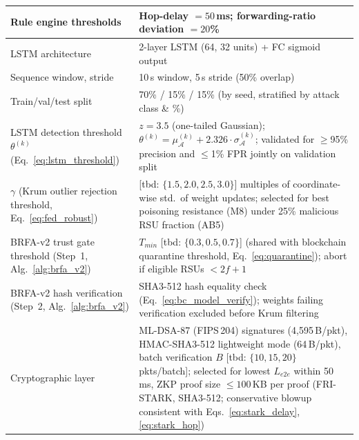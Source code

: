 \documentclass[12pt, a4paper]{report}
\begin{document}
{{\begin{longtable}{|m{5.0cm}|m{9.0cm}|}
            \hline
            Rule engine thresholds & Hop-delay $= 50$\,ms; forwarding-ratio deviation $= 20$\% \\
            \hline
            LSTM architecture & 2-layer LSTM (64, 32 units) + FC sigmoid output \\
            \hline
            Sequence window, stride & 10\,s window, 5\,s stride (50\% overlap) \\
            \hline
            Train/val/test split & 70\% / 15\% / 15\% (by seed, stratified by attack class \& \%) \\
            \hline
            LSTM detection threshold $\theta^{(k)}$ (Eq.~\ref{eq:lstm_threshold}) &
            $z = 3.5$ (one-tailed Gaussian); $\theta^{(k)} = \mu_{\mathcal{A}}^{(k)} + 2.326 \cdot \sigma_{\mathcal{A}}^{(k)}$;
            validated for $\geq$95\% precision and $\leq$1\% FPR jointly on validation split \\           
            \hline
              $\gamma$ (Krum outlier rejection threshold, Eq.~\ref{eq:fed_robust}) & [tbd: $\{1.5, 2.0, 2.5, 3.0\}$] multiples of coordinate-wise std.\ of weight updates;   selected for best poisoning resistance (M8) under 25\% malicious RSU fraction (AB5) \\
            \hline
              BRFA-v2 trust gate threshold (Step~1, Alg.~\ref{alg:brfa_v2}) &              $T_{min}$ [tbd: $\{0.3, 0.5, 0.7\}$] (shared with blockchain quarantine threshold, Eq.~\ref{eq:quarantine}); abort if eligible RSUs $< 2f{+}1$ \\
             \hline
              BRFA-v2 hash verification (Step~2, Alg.~\ref{alg:brfa_v2}) &              SHA3-512 hash equality check (Eq.~\ref{eq:bc_model_verify}); weights failing
              verification excluded before Krum filtering \\
              \hline
            Cryptographic layer & ML-DSA-87 (FIPS\,204) signatures (4,595\,B/pkt),
            HMAC-SHA3-512 lightweight mode (64\,B/pkt),
            batch verification $B$ [tbd: $\{10, 15, 20\}$\,pkts/batch];
            selected for lowest $L_{e2e}$ within 50\,ms,  ZKP proof size  $\leq 100$\,KB per proof   (FRI-STARK, SHA3-512; conservative blowup
             consistent with Eqs.~\ref{eq:stark_delay},
            \ref{eq:stark_hop}) \\


\end{longtable}}}
\end{document}
